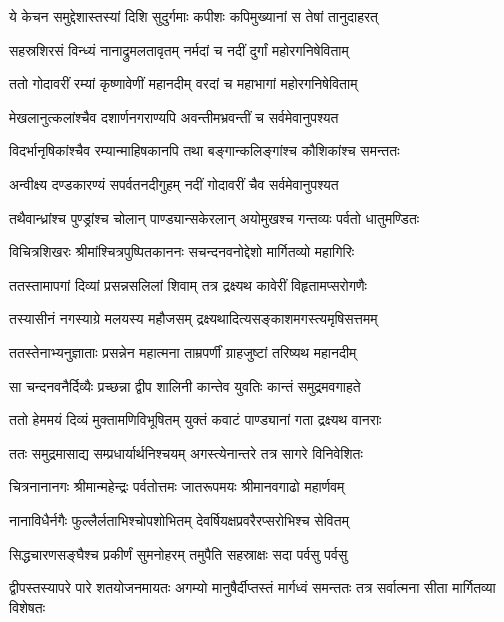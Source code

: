 \twolineshloka
{ये केचन समुद्देशास्तस्यां दिशि सुदुर्गमाः}
{कपीशः कपिमुख्यानां स तेषां तानुदाहरत्} %

\twolineshloka
{सहस्रशिरसं विन्ध्यं नानाद्रुमलतावृतम्}
{नर्मदां च नदीं दुर्गां महोरगनिषेविताम्} %

\twolineshloka
{ततो गोदावरीं रम्यां कृष्णावेणीं महानदीम्}
{वरदां च महाभागां महोरगनिषेविताम्} %

\twolineshloka
{मेखलानुत्कलांश्चैव दशार्णनगराण्यपि}
{अवन्तीमभ्रवन्तीं च सर्वमेवानुपश्यत} %

\twolineshloka
{विदर्भानृषिकांश्चैव रम्यान्माहिषकानपि}
{तथा बङ्गान्कलिङ्गांश्च कौशिकांश्च समन्ततः} %

\twolineshloka
{अन्वीक्ष्य दण्डकारण्यं सपर्वतनदीगुहम्}
{नदीं गोदावरीं चैव सर्वमेवानुपश्यत} %

\twolineshloka
{तथैवान्ध्रांश्च पुण्ड्रांश्च चोलान् पाण्ड्यान्सकेरलान्}
{अयोमुखश्च गन्तव्यः पर्वतो धातुमण्डितः} %

\twolineshloka
{विचित्रशिखरः श्रीमांश्चित्रपुष्पितकाननः}
{सचन्दनवनोद्देशो मार्गितव्यो महागिरिः} %

\twolineshloka
{ततस्तामापगां दिव्यां प्रसन्नसलिलां शिवाम्}
{तत्र द्रक्ष्यथ कावेरीं विहृतामप्सरोगणैः} %

\twolineshloka
{तस्यासीनं नगस्याग्रे मलयस्य महौजसम्}
{द्रक्ष्यथादित्यसङ्काशमगस्त्यमृषिसत्तमम्} %

\twolineshloka
{ततस्तेनाभ्यनुज्ञाताः प्रसन्नेन महात्मना}
{ताम्रपर्णीं ग्राहजुष्टां तरिष्यथ महानदीम्} %

\twolineshloka
{सा चन्दनवनैर्दिव्यैः प्रच्छन्ना द्वीप शालिनी}
{कान्तेव युवतिः कान्तं समुद्रमवगाहते} %

\twolineshloka
{ततो हेममयं दिव्यं मुक्तामणिविभूषितम्}
{युक्तं कवाटं पाण्ड्यानां गता द्रक्ष्यथ वानराः} %

\twolineshloka
{ततः समुद्रमासाद्य सम्प्रधार्यार्थनिश्चयम्}
{अगस्त्येनान्तरे तत्र सागरे विनिवेशितः} %

\twolineshloka
{चित्रनानानगः श्रीमान्महेन्द्रः पर्वतोत्तमः}
{जातरूपमयः श्रीमानवगाढो महार्णवम्} %

\twolineshloka
{नानाविधैर्नगैः फुल्लैर्लताभिश्चोपशोभितम्}
{देवर्षियक्षप्रवरैरप्सरोभिश्च सेवितम्} %

\twolineshloka
{सिद्धचारणसङ्घैश्च प्रकीर्णं सुमनोहरम्}
{तमुपैति सहस्राक्षः सदा पर्वसु पर्वसु} %

\threelineshloka
{द्वीपस्तस्यापरे पारे शतयोजनमायतः}
{अगम्यो मानुषैर्दीप्तस्तं मार्गध्वं समन्ततः}
{तत्र सर्वात्मना सीता मार्गितव्या विशेषतः} %

